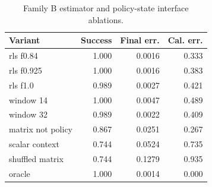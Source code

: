 \begin{table}[t]
\caption{Family B estimator and policy-state interface ablations.}
\label{tab:estimator-ablation}
\centering
\begin{tabular}{lrrr}
\toprule
Variant & Success & Final err. & Cal. err. \\
\midrule
rls f0.84 & 1.000 & 0.0016 & 0.333 \\
rls f0.925 & 1.000 & 0.0016 & 0.383 \\
rls f1.0 & 0.989 & 0.0027 & 0.421 \\
window 14 & 1.000 & 0.0047 & 0.489 \\
window 32 & 0.989 & 0.0022 & 0.409 \\
matrix not policy & 0.867 & 0.0251 & 0.267 \\
scalar context & 0.744 & 0.0524 & 0.735 \\
shuffled matrix & 0.744 & 0.1279 & 0.935 \\
oracle & 1.000 & 0.0014 & 0.000 \\
\bottomrule
\end{tabular}
\end{table}
